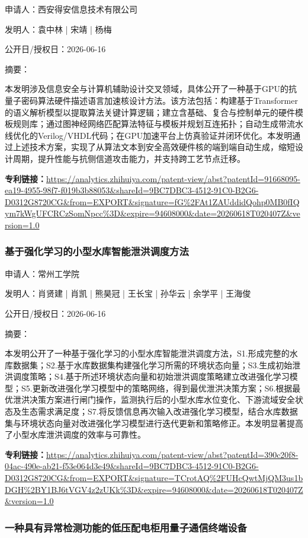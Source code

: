 \documentclass[12pt,a4paper]{ctexart}
\begin{document}
申请人：西安得安信息技术有限公司

发明人：袁中林 | 宋靖 | 杨梅

公开日/授权日：2026-06-16

摘要：

本发明涉及信息安全与计算机辅助设计交叉领域，具体公开了一种基于GPU的抗量子密码算法硬件描述语言加速核设计方法。该方法包括：构建基于Transformer的语义解析模型以提取算法关键计算逻辑；建立含基础、复合与控制单元的硬件模板规则库；通过图神经网络匹配算法特征与模板并规划互连拓扑；自动生成带流水线优化的Verilog/VHDL代码；在GPU加速平台上仿真验证并闭环优化。本发明通过上述技术方案，实现了从算法文本到安全高效硬件核的端到端自动生成，缩短设计周期，提升性能与抗侧信道攻击能力，并支持跨工艺节点迁移。

\noindent\textbf{专利链接：}\url{https://analytics.zhihuiya.com/patent-view/abst?patentId=91668095-ea19-4955-98f7-f019b3b88053&shareId=9BC7DBC3-4512-91C0-B2G6-D0312G8720CG&from=EXPORT&signature=fG%2FAt1ZAUddidQohp0MB0fIQym7kWgUFCRCzSomNpcc%3D&expire=94608000&date=20260618T020407Z&version=1.0}

\subsubsection{ 基于强化学习的小型水库智能泄洪调度方法 }

申请人：常州工学院

发明人：肖贤建 | 肖凯 | 熊昊冠 | 王长宝 | 孙华云 | 余学平 | 王海俊

公开日/授权日：2026-06-16

摘要：

本发明公开了一种基于强化学习的小型水库智能泄洪调度方法，S1.形成完整的水库数据集；S2.基于水库数据集构建强化学习所需的环境状态向量；S3.生成初始泄洪调度策略；S4.基于所述环境状态向量和初始泄洪调度策略建立改进强化学习模型；S5.更新改进强化学习模型中的策略网络，得到最优泄洪决策方案；S6.根据最优泄洪决策方案进行闸门操作，监测执行后的小型水库水位变化、下游流域安全状态及生态需求满足度；S7.将反馈信息再次输入改进强化学习模型，结合水库数据集与环境状态向量对改进强化学习模型进行迭代更新和策略修正。本发明显著提高了小型水库泄洪调度的效率与可靠性。

\noindent\textbf{专利链接：}\url{https://analytics.zhihuiya.com/patent-view/abst?patentId=390c20f8-04ac-490e-ab21-f53e064d3e49&shareId=9BC7DBC3-4512-91C0-B2G6-D0312G8720CG&from=EXPORT&signature=TCrotAQ%2FUHcQwtMjQM3us1bDGH%2BY1BJ6tVGV4z2zUKk%3D&expire=94608000&date=20260618T020407Z&version=1.0}

\subsubsection{ 一种具有异常检测功能的低压配电柜用量子通信终端设备 }
\end{document}
